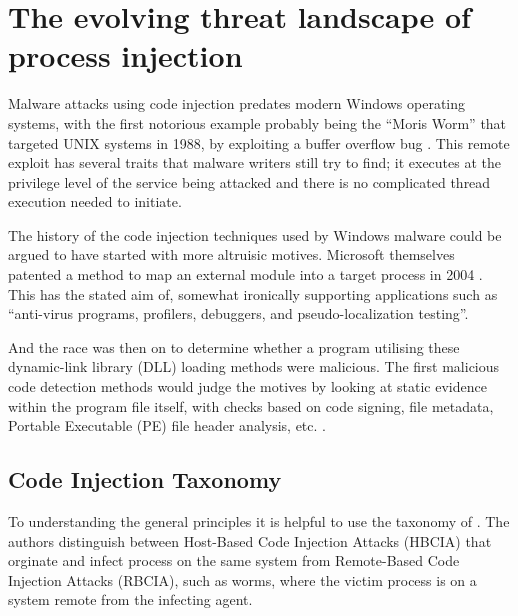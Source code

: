 




\pagebreak
\section{The evolving threat landscape of process injection}

Malware attacks using code injection predates modern Windows operating systems, with the first notorious example probably being the ``Moris Worm''
that targeted UNIX systems in 1988, by exploiting a buffer overflow bug \autocite{Spafford:1989}.  This remote exploit has several
traits that malware writers still try to find; it executes at the privilege level of the service being attacked and there is no complicated
thread execution needed to initiate.

The history of the code injection techniques used by Windows malware could be argued to have started with more altruisic motives.
Microsoft themselves patented a method to map an external module into a target process in 2004 \autocite{Ghizzoni:2004}.  This has the
stated aim of, somewhat ironically supporting applications such as ``anti-virus programs, profilers, debuggers, and pseudo-localization testing''.

And the race was then on to determine whether a program utilising these dynamic-link library (DLL) loading methods were malicious.
The first malicious code detection methods would judge the motives by looking at static evidence within the program file itself,
with checks based on code signing, file metadata, Portable Executable (PE) file header analysis, etc. \autocite{Jang:2007}.

\subsection{Code Injection Taxonomy}

To understanding the general principles it is helpful to use the taxonomy of \textcite{Barabosch:2014}.
The authors distinguish between Host-Based Code Injection Attacks (HBCIA) that orginate and infect process on the
same system from Remote-Based Code Injection Attacks (RBCIA), such as worms, where the victim process is on a system
remote from the infecting agent.

